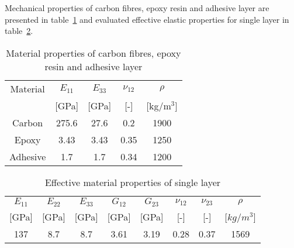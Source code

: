 \documentclass[a4paper,12pt]{article}
\begin{document}
Mechanical properties of carbon fibres, epoxy resin and adhesive layer are 
presented in table~\ref{tab:properties} and evaluated effective elastic 
properties for single layer in table~\ref{tab:properties_layer}.
\begin{table}
\centering
\caption{\label{tab:properties}Material properties of carbon fibres, epoxy resin and adhesive layer}
\begin{tabular}{ccccc}\hline
Material & $E_{11}$ &  $E_{33}$ & $\nu_{12}$ & $\rho$ \\
 & [GPa] &  [GPa] & [-] & [kg/m$^3$]\\
\hline
Carbon & 275.6 & 27.6 & 0.2 & 1900\\
Epoxy & 3.43 & 3.43 & 0.35 & 1250\\
Adhesive & 1.7 & 1.7 & 0.34 & 1200\\
\end{tabular}
\end{table}

\begin{table}
\centering
\caption{\label{tab:properties_layer}Effective material properties of single layer}
\begin{tabular}{cccccccc}
\hline
 $E_{11}$ & $E_{22}$ & $E_{33}$ & $G_{12}$ & $G_{23}$ & $\nu_{12}$ & $\nu_{23}$ & $\rho$ \\
$[$GPa] & [GPa] & [GPa] & [GPa] & [GPa] & [-] & [-] & $[kg/m^3$]\\
\hline
137 & 8.7 & 8.7 & 3.61 & 3.19 & 0.28 & 0.37 & 1569\\
\hline
\end{tabular}
\end{table}
\end{document}
